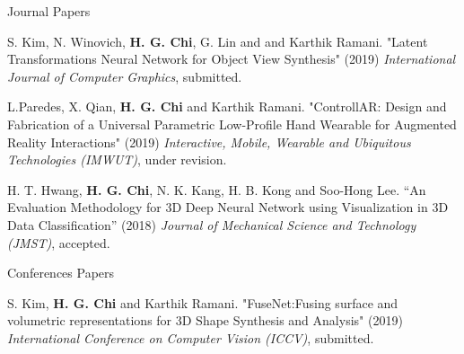 


\begin{cventries}


\cvpub
{Journal Papers} %
{ %
\begin{cvitems}
\item {S. Kim, N. Winovich, \textbf{H. G. Chi}, G. Lin and and Karthik Ramani. "Latent Transformations Neural Network for Object View Synthesis" (2019) \textit{International Journal of Computer Graphics}, submitted.}
\item {L.Paredes, X. Qian, \textbf{H. G. Chi} and Karthik Ramani. "ControllAR: Design and Fabrication of a Universal Parametric Low-Profile Hand Wearable for Augmented Reality Interactions" (2019) \textit{Interactive, Mobile, Wearable and Ubiquitous Technologies (IMWUT)}, under revision.}
\item {H. T. Hwang, \textbf{H. G. Chi}, N. K. Kang, H. B. Kong and Soo-Hong Lee. “An Evaluation Methodology for 3D Deep Neural Network using Visualization in 3D Data Classification” (2018) \textit{Journal of Mechanical Science and Technology (JMST)}, accepted.}
\end{cvitems}
}


\cvpub
{Conferences Papers} %
{ %
\begin{cvitems}
\item {S. Kim, \textbf{H. G. Chi} and Karthik Ramani. "FuseNet:Fusing surface and volumetric representations for 3D Shape Synthesis and Analysis" (2019) \textit{International Conference on Computer Vision (ICCV)}, submitted.}
\end{cvitems}
}


\end{cventries}